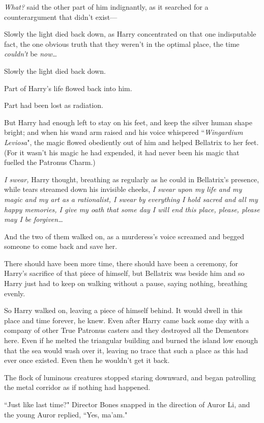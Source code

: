\emph{What?} said the other part of him indignantly, as it searched for a counterargument that didn't exist—

Slowly the light died back down, as Harry concentrated on that one indisputable fact, the one obvious truth that they weren't in the optimal place, the time \emph{couldn't} be \emph{now{\ldots}}

Slowly the light died back down.

Part of Harry's life flowed back into him.

Part had been lost as radiation.

But Harry had enough left to stay on his feet, and keep the silver human shape bright; and when his wand arm raised and his voice whispered ``\emph{Wingardium Leviosa}", the magic flowed obediently out of him and helped Bellatrix to her feet. (For it wasn't his magic he had expended, it had never been his magic that fuelled the Patronus Charm.)

\emph{I swear,} Harry thought, breathing as regularly as he could in Bellatrix's presence, while tears streamed down his invisible cheeks, \emph{I swear upon my life and my magic and my art as a rationalist, I swear by everything I hold sacred and all my happy memories, I give my oath that some day I will end this place, please, please may I be forgiven{\ldots}}

And the two of them walked on, as a murderess's voice screamed and begged someone to come back and save her.

There should have been more time, there should have been a ceremony, for Harry's sacrifice of that piece of himself, but Bellatrix was beside him and so Harry just had to keep on walking without a pause, saying nothing, breathing evenly.

So Harry walked on, leaving a piece of himself behind. It would dwell in this place and time forever, he knew. Even after Harry came back some day with a company of other True Patronus casters and they destroyed all the Dementors here. Even if he melted the triangular building and burned the island low enough that the sea would wash over it, leaving no trace that such a place as this had ever once existed. Even then he wouldn't get it back.

\later

The flock of luminous creatures stopped staring downward, and began patrolling the metal corridor as if nothing had happened.

``Just like last time?" Director Bones snapped in the direction of Auror Li, and the young Auror replied, ``Yes, ma'am."


